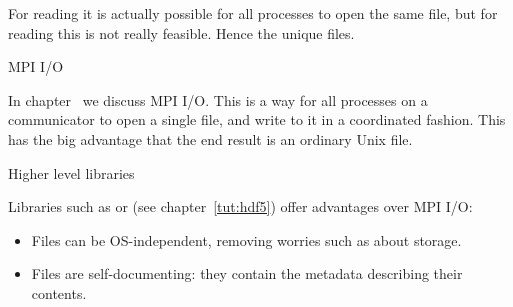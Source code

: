 For reading it is actually possible for all processes to open the same file,
but for reading this is not really feasible. Hence the unique files.

 {MPI I/O}

In chapter~ we discuss MPI I/O.
This is a way for all processes on a communicator to open a single file,
and write to it in a coordinated fashion.
This has the big advantage that the end result is an ordinary Unix file.

 {Higher level libraries}

Libraries such as  or 
(see chapter~\ref{tut:hdf5})
offer advantages over MPI I/O:
\begin{itemize}
\item Files can be OS-independent, removing worries such
  as about  storage.
\item Files are self-documenting: they contain the metadata describing their contents.
\end{itemize}


